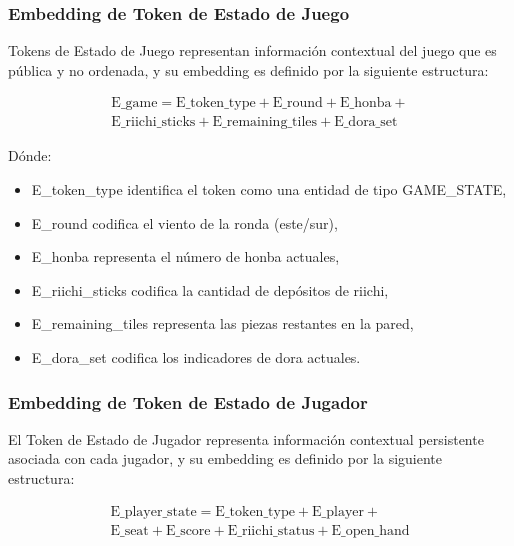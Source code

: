 \subsubsection{Embedding de Token de Estado de Juego}

Tokens de Estado de Juego representan información contextual del juego que es pública y no ordenada, y su embedding es definido por la siguiente estructura:

\begin{equation}
  \begin{split}
    \text{E\_game} = \text{E\_token\_type} + \text{E\_round} + \text{E\_honba} + \\ \text{E\_riichi\_sticks} + \text{E\_remaining\_tiles} + \text{E\_dora\_set}
  \end{split}
\end{equation}

Dónde:

\begin{itemize}
  \item E\_token\_type identifica el token como una entidad de tipo GAME\_STATE,
  \item E\_round codifica el viento de la ronda (este/sur),
  \item E\_honba representa el número de honba actuales,
  \item E\_riichi\_sticks codifica la cantidad de depósitos de riichi,
  \item E\_remaining\_tiles representa las piezas restantes en la pared,
  \item E\_dora\_set codifica los indicadores de dora actuales.
\end{itemize}

\subsubsection{Embedding de Token de Estado de Jugador}

El Token de Estado de Jugador representa información contextual persistente asociada con cada jugador, y su embedding es definido por la siguiente estructura:


\begin{equation}
  \begin{split}
    \text{E\_player\_state} = \text{E\_token\_type} + \text{E\_player} + \\ \text{E\_seat} + \text{E\_score} + \text{E\_riichi\_status} + \text{E\_open\_hand}
  \end{split}
\end{equation}

